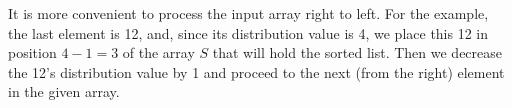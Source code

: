 \documentclass[preview]{standalone}
\begin{document}
\begin{center}
It is more convenient to process the input array right to left. For the example, the last element is 12, and, since its distribution value is 4, we place this 12 in position $4 - 1 = 3$ of the array $S$ that will hold the sorted list. Then we decrease the 12’s distribution value by 1 and proceed to the next (from the right) element in the given array.
\end{center}
\end{document}
